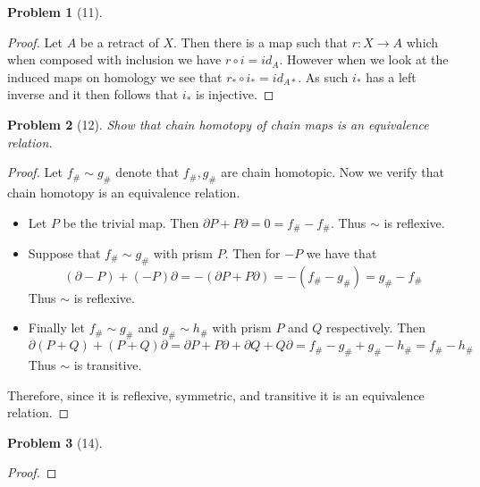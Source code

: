 \documentclass[10pt]{article}
\newcommand{\sk}{\vskip 10mm}
\theoremstyle{plain}
\newtheorem{problem}{Problem}
\theoremstyle{remark}
\begin{document}
\begin{problem}[11]
  
\end{problem}

\begin{proof}
  Let $A$ be a retract of $X$. Then there is a map such that
  $r:X\rightarrow A$ which when composed with inclusion we have
  $r\circ i= id_A$. However when we look at the induced maps on
  homology we see that $r_*\circ i_*=id_{A*}$. As such $i_*$ has
  a left inverse and it then follows that $i_*$ is injective.
\end{proof}

\sk

\begin{problem}[12]
  Show that chain homotopy of chain maps is an equivalence relation.
\end{problem}

\begin{proof}
  Let $f_\#\sim g_\#$ denote that $f_\#,g_\#$ are chain homotopic. Now we verify
  that chain homotopy is an equivalence relation.

  \begin{itemize}
  \item
    Let $P$ be the trivial map. Then $\partial P + P\partial=0=f_\#-f_\#$. Thus
    $\sim$ is reflexive.
  \item
    Suppose that $f_\#\sim g_\#$ with prism $P$. Then for $-P$ we
    have that
    \[(\partial -P)+(-P)\partial = -(\partial P+P\partial)=-(f_\#-g_\#)=g_\#-f_\#\]
    Thus $\sim$ is reflexive.
  \item
    Finally let $f_\#\sim g_\#$ and $g_\#\sim h_\#$ with prism $P$ and $Q$ respectively.
    Then
    \[ \partial(P+Q) +(P+Q)\partial = \partial P + P\partial+\partial Q + Q\partial=f_\#-g_\#+g_\#-h_\#=f_\#-h_\# \]
    Thus $\sim$ is transitive.
  \end{itemize}

  Therefore, since it is reflexive, symmetric, and transitive it is an equivalence relation.
\end{proof}

\sk

\begin{problem}[14]
  
\end{problem}

\begin{proof}
  
\end{proof}

\sk

\end{document}
